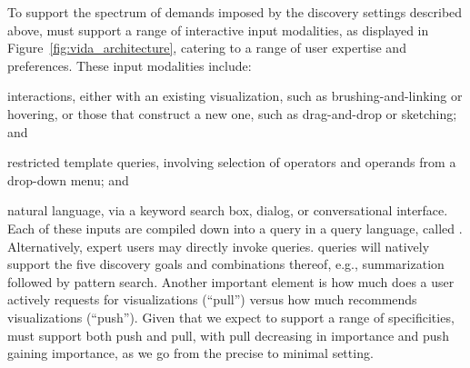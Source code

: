 \par
{} To support the spectrum of 
demands imposed by the
discovery settings described above, \vida 
must support a range of interactive input modalities,
as displayed in Figure~\ref{fig:vida_architecture},
catering to a range of user expertise and preferences.
These input modalities include: 
\squishlist
	\item interactions, either with an existing visualization, such as brushing-and-linking or hovering, or those that construct a new one, such as drag-and-drop or sketching; and
	\item restricted template queries, involving selection of operators and operands from a drop-down menu; and
	\item natural language, via a keyword search box, dialog, or conversational interface.
\squishend
Each of these inputs are compiled down
into a query in a query language, called \vidaql.
Alternatively, expert users may directly invoke \vidaql queries.
\vidaql queries will natively support the five discovery goals and combinations thereof, e.g., summarization followed by pattern search. Another important element is how much does a user actively requests for visualizations (``pull'') versus how much \vida recommends visualizations (``push''). Given that we expect \vida to support a range of specificities, \vida must support both push and pull, with pull decreasing in importance and push gaining importance, as we go from the precise to minimal setting.





